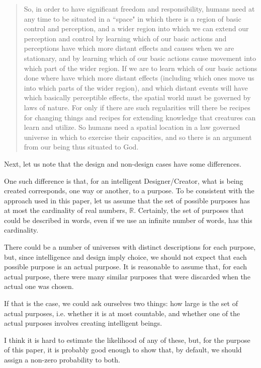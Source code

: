 \documentclass[a4paper
,draft
]{article}
\def\reale{\mathbb{R}}
\newcommand{\paper}[1]{paper}
\newcommand{\ghilimele}[1]{``#1"}
\begin{document}
\begin{quote}
  So, in order to have significant freedom and responsibility, humans need
  at any time to be situated in a \ghilimele{space} in which there is a
  region of basic control and perception, and a wider region into which
  we can extend our perception and control by learning which of our
  basic actions and perceptions have which more distant effects and causes
  when we are stationary, and by learning which of our basic actions cause
  movement into which part of the wider region.
  If we are to learn which of our basic actions done where have which
  more distant effects (including which ones move us into which parts
  of the wider region), and which distant events will have which basically
  perceptible effects, the spatial world must be governed by laws of nature.
  For only if there are such regularities will there be recipes for changing
  things and recipes for extending knowledge that creatures can learn and
  utilize.
  So humans need a spatial location in a law governed universe in which to
  exercise their capacities, and so there is an argument from our being thus
  situated to God.
\end{quote}

Next, let us note that the design and non-design cases
have some differences.

One such difference is that, for an intelligent Designer/Creator, what is being
created corresponds, one way or another, to a purpose.
To be consistent with
the approach used in this \paper{}, let us assume that the set of possible
purposes has at most the cardinality of real numbers, $\reale$. Certainly,
the set of purposes that could be described in words, even if we use an infinite
number of words, has this cardinality.

There could be a number of universes with
distinct descriptions for each purpose, but, since intelligence and design
imply choice, we should not expect that each
possible purpose is an actual purpose.
It is reasonable to assume that, for each actual purpose,
there were many similar purposes that were discarded when the actual one
was chosen.

If that is the case, we could ask ourselves two things:
how large is the set of actual
purposes, i.e. whether it is at most countable,
and whether one of the actual purposes involves creating intelligent beings.

I think it is hard to estimate the likelihood of any of these, but, for the
purpose of this \paper{}, it is probably good enough to show that, by default,
we should assign a non-zero probability to both.
\end{document}

